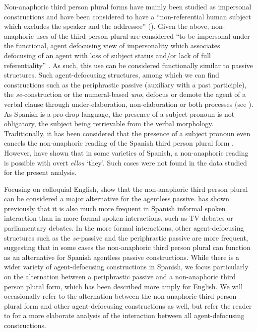 \documentclass[output=paper]{langscibook}
\begin{document}
Non-anaphoric third person plural forms have mainly been studied as impersonal constructions and have been considered to have a “non-referential human subject which excludes the speaker and the addressee” (\citealt[577]{SiewierskaPapastathi2011}). Given the above, non-anaphoric uses of the third person plural are considered “to be impersonal under the functional, agent defocusing view of impersonality which associates defocusing of an agent with loss of subject status and/or lack of full referentiality” \citep[74]{Siewierska2010}. As such, this use can be considered functionally similar to passive structures. Such agent-defocusing structures, among which we can find constructions such as the periphrastic passive (auxiliary with a past participle), the \textit{se}-construction or the numeral-based \textit{uno}, defocus or demote the agent of a verbal clause through under-elaboration, non-elaboration or both processes (see \citealt{Siewierska2008}). As Spanish is a pro-drop language, the presence of a subject pronoun is not obligatory, the subject being retrievable from the verbal morphology. Traditionally, it has been considered that the presence of a subject pronoun even cancels the non-anaphoric reading of the Spanish third person plural form \citep[1739]{FernándezSoriano1999Construcciones}. However, \citet{LapidusOtheguy2005} have shown that in some varieties of Spanish, a non-anaphoric reading is possible with overt \textit{ellos} ‘they’. Such cases were not found in the data studied for the present analysis.


Focusing on colloquial English, \citet[35--36]{WeinerLabov1983} show that the non-anaphoric third person plural can be considered a major alternative for the agentless passive. \citet[194]{DeCock2014} has shown previously that it is also much more frequent in Spanish informal spoken interaction than in more formal spoken interactions, such as TV debates or parliamentary debates. In the more formal interactions, other agent-defocusing structures such as the \textit{se}-passive and the periphrastic passive are more frequent, suggesting that in some cases the non-anaphoric third person plural can function as an alternative for Spanish agentless passive constructions. While there is a wider variety of agent-defocusing constructions in Spanish, we focus particularly on the alternation between a periphrastic passive and a non-anaphoric third person plural form, which has been described more amply for English. We will occasionally refer to the alternation between the non-anaphoric third person plural form and other agent-defocusing constructions as well, but refer the reader to \citet{Pierre2021} for a more elaborate analysis of the interaction between all agent-defocusing constructions.
\end{document}
